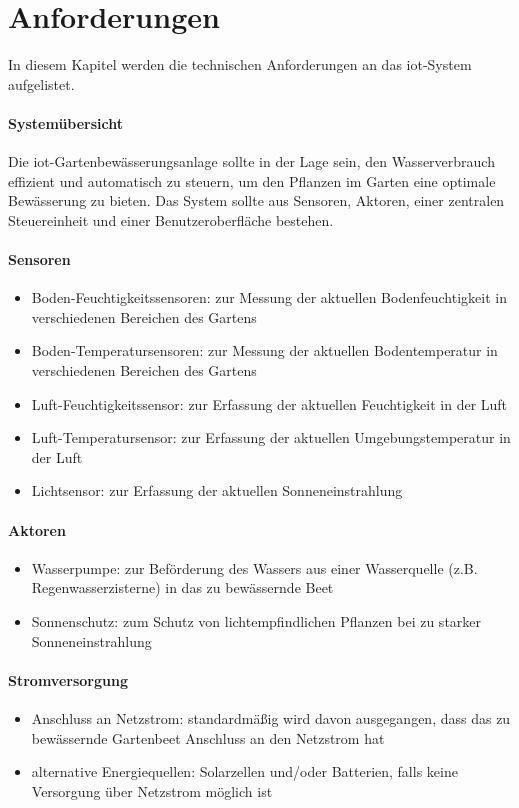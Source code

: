 
\section{Anforderungen} \label{sec:anforderungen}
In diesem Kapitel werden die technischen Anforderungen an das \gls{iot}-System aufgelistet.

\paragraph{Systemübersicht}
Die \gls{iot}-Gartenbewässerungsanlage sollte in der Lage sein, den Wasserverbrauch effizient und automatisch zu steuern, um den Pflanzen im Garten eine optimale Bewässerung zu bieten. Das System sollte aus Sensoren, Aktoren, einer zentralen Steuereinheit und einer Benutzeroberfläche bestehen.

\paragraph{Sensoren}
\begin{itemize}
  \item Boden-Feuchtigkeitssensoren: zur Messung der aktuellen Bodenfeuchtigkeit in verschiedenen Bereichen des Gartens
  \item Boden-Temperatursensoren: zur Messung der aktuellen Bodentemperatur in verschiedenen Bereichen des Gartens
  \item Luft-Feuchtigkeitssensor: zur Erfassung der aktuellen Feuchtigkeit in der Luft
  \item Luft-Temperatursensor: zur Erfassung der aktuellen Umgebungstemperatur in der Luft
  \item Lichtsensor: zur Erfassung der aktuellen Sonneneinstrahlung
\end{itemize}

\paragraph{Aktoren}
\begin{itemize}
  \item Wasserpumpe: zur Beförderung des Wassers aus einer Wasserquelle (z.B. Regenwasserzisterne) in das zu bewässernde Beet
  \item Sonnenschutz: zum Schutz von lichtempfindlichen Pflanzen bei zu starker Sonneneinstrahlung
\end{itemize}

\paragraph{Stromversorgung}
\begin{itemize}
  \item Anschluss an Netzstrom: standardmäßig wird davon ausgegangen, dass das zu bewässernde Gartenbeet Anschluss an den Netzstrom hat
  \item alternative Energiequellen: Solarzellen und/oder Batterien, falls keine Versorgung über Netzstrom möglich ist
\end{itemize}

